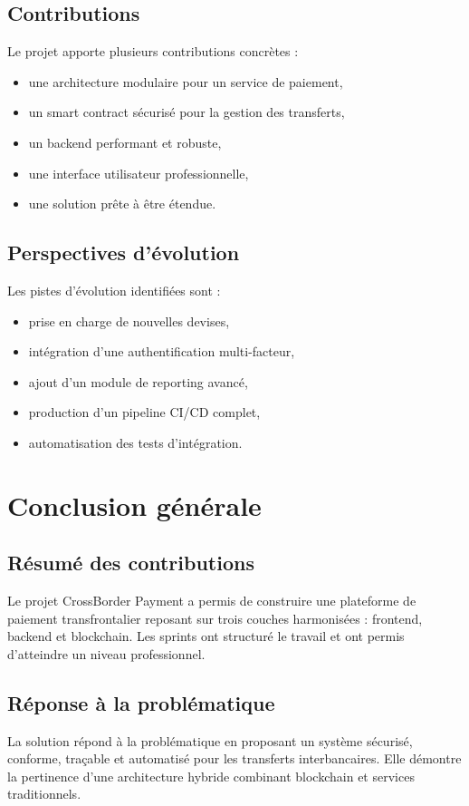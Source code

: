 \documentclass[a4paper,12pt]{report}
\begin{document}
\section{Contributions} 
Le projet apporte plusieurs contributions concrètes :
\begin{itemize}[leftmargin=*,nosep]
  \item une architecture modulaire pour un service de paiement,
  \item un smart contract sécurisé pour la gestion des transferts,
  \item un backend performant et robuste,
  \item une interface utilisateur professionnelle,
  \item une solution prête à être étendue.
\end{itemize}

\section{Perspectives d'évolution}
Les pistes d'évolution identifiées sont :
\begin{itemize}[leftmargin=*,nosep]
  \item prise en charge de nouvelles devises,
  \item intégration d'une authentification multi-facteur,
  \item ajout d'un module de reporting avancé,
  \item production d'un pipeline CI/CD complet,
  \item automatisation des tests d'intégration.
\end{itemize}

\chapter{Conclusion générale}
\section{Résumé des contributions}
Le projet CrossBorder Payment a permis de construire une plateforme de paiement transfrontalier reposant sur trois couches harmonisées : frontend, backend et blockchain. Les sprints ont structuré le travail et ont permis d'atteindre un niveau professionnel.

\section{Réponse à la problématique}
La solution répond à la problématique en proposant un système sécurisé, conforme, traçable et automatisé pour les transferts interbancaires. Elle démontre la pertinence d'une architecture hybride combinant blockchain et services traditionnels.
\end{document}
